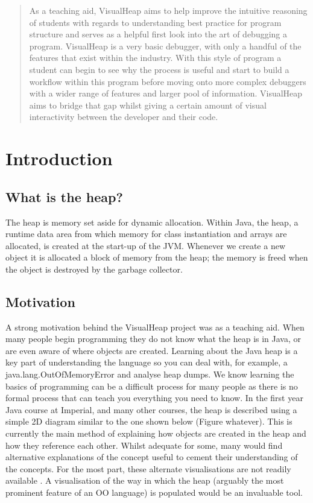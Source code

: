 \documentclass[11pt, a4paper]{report}
\begin{document}
\begin{abstract}
As a teaching aid, VisualHeap aims to help improve the intuitive reasoning of students with regards to understanding best practice for program structure and serves as a helpful first look into the art of debugging a program. VisualHeap is a very basic debugger, with only a handful of the features that exist within the industry. With this style of program a student can begin to see why the process is useful and start to build a workflow within this program before moving onto more complex debuggers with a wider range of features and larger pool of information.  VisualHeap aims to bridge that gap whilst giving a certain amount of visual interactivity between the developer and their code. 
\end{abstract}

\chapter{Introduction}
\section{What is the heap?}

The heap is memory set aside for dynamic allocation. Within Java, the heap, a runtime data area from which memory for class instantiation and arrays are allocated, is created at the start-up of the JVM. Whenever we create a new object it is allocated a block of memory from the heap; the memory is freed when the object is destroyed by the garbage collector.

\section{Motivation}

A strong motivation behind the VisualHeap project was as a teaching aid. When many people begin programming they do not know what the heap is in Java, or are even aware of where objects are created. Learning about the Java heap is a key part of understanding the language so you can deal with, for example, a java.lang.OutOfMemoryError and analyse heap dumps. We know learning the basics of programming can be a difficult process for many people as there is no formal process that can teach you everything you need to know. In the first year Java course at Imperial, and many other courses, the heap is described using a simple 2D diagram similar to the one shown below (Figure whatever). This is currently the main method of explaining how objects are created in the heap and how they reference each other. Whilst adequate for some, many would find alternative explanations of the concept useful to cement their understanding of the concepts. For the most part, these alternate visualisations are not readily available . A visualisation of the way in which the heap (arguably the most prominent feature of an OO language) is populated would be an invaluable tool. 
\end{document}
